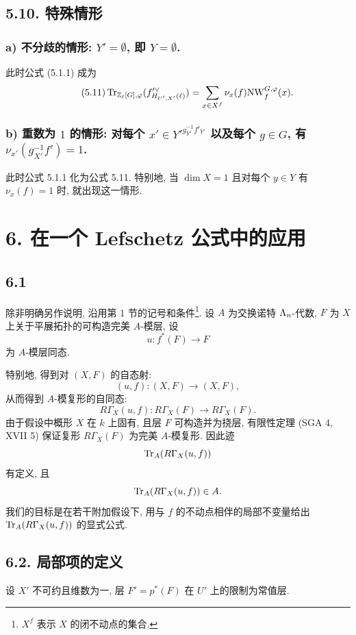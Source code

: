 \subsection*{5.10. 特殊情形}
\subsubsection*{a) 不分歧的情形: $Y'=\emptyset$, 即 $Y=\emptyset$.}
此时公式 (5.1.1) 成为
\begin{equation}\tag{5.11}
\operatorname{Tr}_{\mathbb Z_\ell[G],\varphi}(f'^\vee_{H_{U',X'}(\ell)})
=
\sum_{x\in X^f}\nu_x(f)\mathrm{NW}_f^{G,\varphi}(x).
\end{equation}

\subsubsection*{b) 重数为 $1$ 的情形: 对每个 $x'\in {Y'}^{g_{Y'}^{-1}f'_{Y'}}$ 以及每个 $g\in G$, 有 $\nu_{x'}(g_{X'}^{-1}f')=1$.}
此时公式 5.1.1 化为公式 5.11. 特别地, 当 $\dim X=1$ 且对每个 $y\in Y$ 有 $\nu_x(f)=1$ 时, 就出现这一情形.

\section*{6. 在一个 Lefschetz 公式中的应用}

\subsection*{6.1}
除非明确另作说明, 沿用第 1 节的记号和条件\footnote{$X^f$ 表示 $X$ 的闭不动点的集合.}. 设 $A$ 为交换诺特 $\Lambda_n$-代数, $F$ 为 $X$ 上关于平展拓扑的可构造完美 $A$-模层, 设
\[
u:f^*(F)\longrightarrow F
\]
为 $A$-模层同态.

特别地, 得到对 $(X,F)$ 的自态射:
\[
(u,f):(X,F)\longrightarrow (X,F),
\]
从而得到 $A$-模复形的自同态:
\[
R\Gamma_X(u,f):R\Gamma_X(F)\longrightarrow R\Gamma_X(F).
\]
由于假设中概形 $X$ 在 $k$ 上固有, 且层 $F$ 可构造并为挠层, 有限性定理 (SGA 4, XVII 5) 保证复形 $R\Gamma_X(F)$ 为完美 $A$-模复形. 因此迹
\[
\operatorname{Tr}_A(R\Gamma_X(u,f))
\]
有定义, 且
\[
\operatorname{Tr}_A(R\Gamma_X(u,f))\in A.
\]
我们的目标是在若干附加假设下, 用与 $f$ 的不动点相伴的局部不变量给出 $\operatorname{Tr}_A(R\Gamma_X(u,f))$ 的显式公式.

\subsection*{6.2. 局部项的定义}
设 $X'$ 不可约且维数为一, 层 $F'=p^*(F)$ 在 $U'$ 上的限制为常值层.

